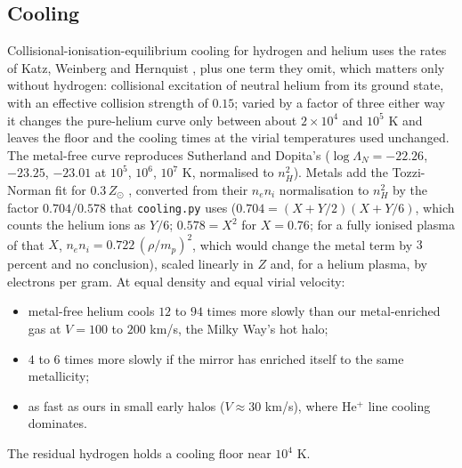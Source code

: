 \documentclass[11pt]{article}
\theoremstyle{definition}
\theoremstyle{plain}
\providecommand{\file}{}\renewcommand{\file}[1]{\texttt{#1}}
\begin{document}
\subsection*{Cooling}
\label{c:note.simulations.setting-cooling}
Collisional-ionisation-equilibrium cooling for hydrogen and helium uses the rates of Katz, Weinberg and Hernquist \cite{KWH1996}, plus one term they omit, which matters only without hydrogen: collisional excitation of neutral helium from its ground state, with an effective collision strength of $0.15$; varied by a factor of three either way it changes the pure-helium curve only between about $2 \times 10^{4}$ and $10^{5}$ K and leaves the floor and the cooling times at the virial temperatures used unchanged. The metal-free curve reproduces Sutherland and Dopita's \cite{SutherlandDopita1993} ($\log\Lambda_{N} = -22.26$, $-23.25$, $-23.01$ at $10^{5}$, $10^{6}$, $10^{7}$ K, normalised to $n_{H}^{2}$). Metals add the Tozzi-Norman fit for $0.3\,Z_{\odot}$ \cite{TozziNorman2001}, converted from their $n_{e}n_{i}$ normalisation to $n_{H}^{2}$ by the factor $0.704/0.578$ that \file{cooling.py} uses ($0.704 = (X + Y/2)(X + Y/6)$, which counts the helium ions as $Y/6$; $0.578 = X^{2}$ for $X = 0.76$; for a fully ionised plasma of that $X$, $n_{e}n_{i} = 0.722\,(\rho/m_{p})^{2}$, which would change the metal term by $3$ percent and no conclusion), scaled linearly in $Z$ and, for a helium plasma, by electrons per gram. At equal density and equal virial velocity:
\begin{itemize}
\item metal-free helium cools $12$ to $94$ times more slowly than our metal-enriched gas at $V = 100$ to $200$ km/s, the Milky Way's hot halo;
\item $4$ to $6$ times more slowly if the mirror has enriched itself to the same metallicity;
\item as fast as ours in small early halos ($V \approx 30$ km/s), where He$^{+}$ line cooling dominates.
\end{itemize}
The residual hydrogen holds a cooling floor near $10^{4}$ K.
\end{document}
